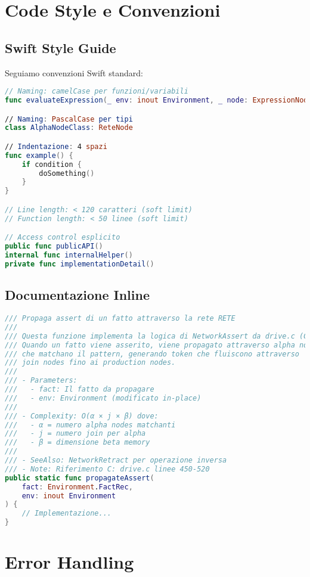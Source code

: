 \section{Code Style e Convenzioni}

\subsection{Swift Style Guide}

Seguiamo convenzioni Swift standard:

\begin{lstlisting}[language=Swift]
// Naming: camelCase per funzioni/variabili
func evaluateExpression(_ env: inout Environment, _ node: ExpressionNode) -> Value

// Naming: PascalCase per tipi
class AlphaNodeClass: ReteNode

// Indentazione: 4 spazi
func example() {
    if condition {
        doSomething()
    }
}

// Line length: < 120 caratteri (soft limit)
// Function length: < 50 linee (soft limit)

// Access control esplicito
public func publicAPI()
internal func internalHelper()
private func implementationDetail()
\end{lstlisting}

\subsection{Documentazione Inline}

\begin{lstlisting}[language=Swift]
/// Propaga assert di un fatto attraverso la rete RETE
///
/// Questa funzione implementa la logica di NetworkAssert da drive.c (CLIPS).
/// Quando un fatto viene asserito, viene propagato attraverso alpha nodes
/// che matchano il pattern, generando token che fluiscono attraverso
/// join nodes fino ai production nodes.
///
/// - Parameters:
///   - fact: Il fatto da propagare
///   - env: Environment (modificato in-place)
///
/// - Complexity: O(α × j × β) dove:
///   - α = numero alpha nodes matchanti
///   - j = numero join per alpha
///   - β = dimensione beta memory
///
/// - SeeAlso: NetworkRetract per operazione inversa
/// - Note: Riferimento C: drive.c linee 450-520
public static func propagateAssert(
    fact: Environment.FactRec,
    env: inout Environment
) {
    // Implementazione...
}
\end{lstlisting}

\section{Error Handling}

